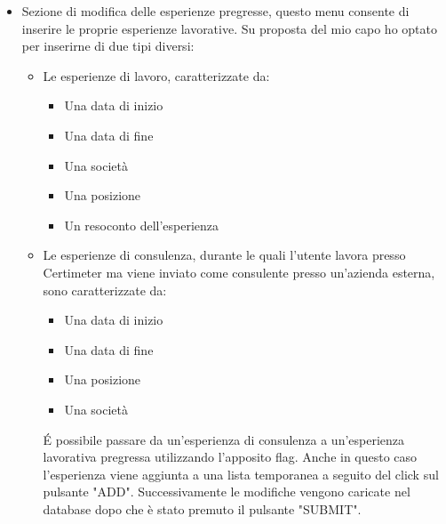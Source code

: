\begin{itemize}
    \item Sezione di modifica delle esperienze pregresse, questo menu consente di inserire le proprie esperienze lavorative. Su proposta del mio capo ho optato per inserirne di due tipi diversi:
    \begin{itemize}
        \item Le esperienze di lavoro, caratterizzate da:
        \begin{itemize}
            \item Una data di inizio
            \item Una data di fine
            \item Una società
            \item Una posizione
            \item Un resoconto dell'esperienza
        \end{itemize}
        \item Le esperienze di consulenza, durante le quali l'utente lavora presso Certimeter ma viene inviato come consulente presso un'azienda esterna, sono caratterizzate da:
        \begin{itemize}
            \item Una data di inizio
            \item Una data di fine
            \item Una posizione
            \item Una società
        \end{itemize}
        \'E possibile passare da un'esperienza di consulenza a un'esperienza lavorativa pregressa utilizzando l'apposito flag. Anche in questo caso l'esperienza viene aggiunta a una lista temporanea a seguito del click sul pulsante "ADD". Successivamente le modifiche vengono caricate nel database dopo che è stato premuto il pulsante "SUBMIT".
    \end{itemize}
\end{itemize}

